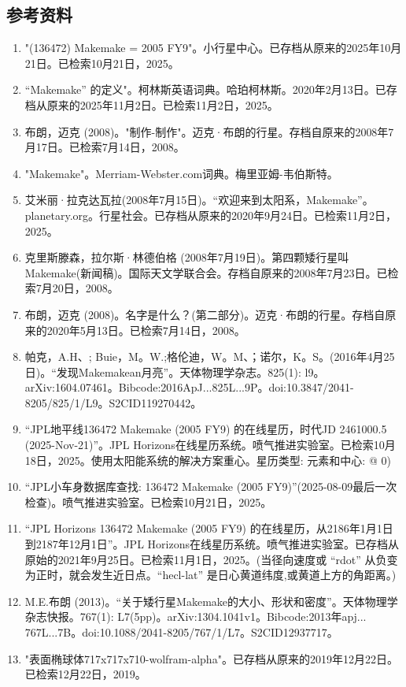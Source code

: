 \subsection{参考资料}
\begin{enumerate}
\item "(136472) Makemake = 2005 FY9"。小行星中心。已存档从原来的2025年10月21日。已检索10月21日，2025。
\item “Makemake” 的定义"。柯林斯英语词典。哈珀柯林斯。2020年2月13日。已存档从原来的2025年11月2日。已检索11月2日，2025。
\item 布朗，迈克 (2008)。"制作-制作"。迈克·布朗的行星。存档自原来的2008年7月17日。已检索7月14日，2008。
\item "Makemake"。Merriam-Webster.com词典。梅里亚姆-韦伯斯特。
\item 艾米丽·拉克达瓦拉(2008年7月15日)。“欢迎来到太阳系，Makemake”。planetary.org。行星社会。已存档从原来的2020年9月24日。已检索11月2日，2025。
\item 克里斯滕森，拉尔斯·林德伯格 (2008年7月19日)。第四颗矮行星叫Makemake(新闻稿)。国际天文学联合会。存档自原来的2008年7月23日。已检索7月20日，2008。
\item 布朗，迈克 (2008)。名字是什么？(第二部分)。迈克·布朗的行星。存档自原来的2020年5月13日。已检索7月14日，2008。
\item 帕克，A.H、; Buie，M。W.;格伦迪，W。M、；诺尔，K。S。(2016年4月25日)。“发现Makemakean月亮”。天体物理学杂志。825(1): l9。arXiv:1604.07461。Bibcode:2016ApJ...825L...9P。doi:10.3847/2041-8205/825/1/L9。S2CID119270442。 
\item “JPL地平线136472 Makemake (2005 FY9) 的在线星历，时代JD 2461000.5 (2025-Nov-21)”。JPL Horizons在线星历系统。喷气推进实验室。已检索10月18日，2025。使用太阳能系统的解决方案重心。星历类型: 元素和中心: @ 0)
\item “JPL小车身数据库查找: 136472 Makemake (2005 FY9)”(2025-08-09最后一次检查)。喷气推进实验室。已检索10月21日，2025。
\item “JPL Horizons 136472 Makemake (2005 FY9) 的在线星历，从2186年1月1日到2187年12月1日”。JPL Horizons在线星历系统。喷气推进实验室。已存档从原始的2021年9月25日。已检索11月1日，2025。(当径向速度或 “rdot” 从负变为正时，就会发生近日点。“hecl-lat” 是日心黄道纬度,或黄道上方的角距离。)
\item M.E.布朗 (2013)。“关于矮行星Makemake的大小、形状和密度”。天体物理学杂志快报。767(1): L7(5pp)。arXiv:1304.1041v1。Bibcode:2013年apj... 767L...7B。doi:10.1088/2041-8205/767/1/L7。S2CID12937717。 
\item "表面椭球体717x717x710-wolfram-alpha"。已存档从原来的2019年12月22日。已检索12月22日，2019。

\end{enumerate}
